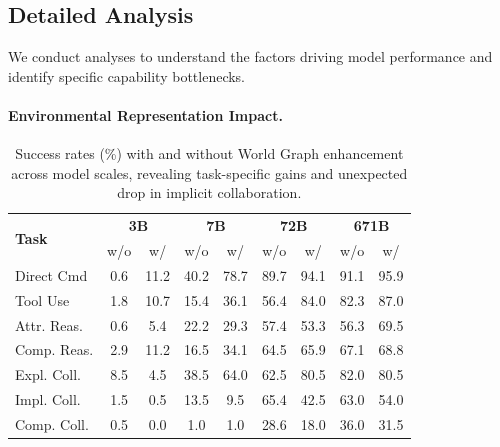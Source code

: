 \subsection{Detailed Analysis}
We conduct analyses to understand the factors driving model performance and identify specific capability bottlenecks.

\paragraph{Environmental Representation Impact.}
\begin{table}
\centering
\small
\setlength{\tabcolsep}{2pt}
\begin{tabular}{@{}lcc|cc|cc|cc@{}}
\toprule
\multirow{2}{*}{\textbf{Task}} & \multicolumn{2}{c|}{\textbf{3B}} & \multicolumn{2}{c|}{\textbf{7B}} & \multicolumn{2}{c|}{\textbf{72B}} & \multicolumn{2}{c}{\textbf{671B}} \\
\cmidrule{2-3} \cmidrule{4-5} \cmidrule{6-7} \cmidrule{8-9}
& w/o & w/ & w/o & w/ & w/o & w/ & w/o & w/ \\
\midrule
Direct Cmd & 0.6 & 11.2 & 40.2 & 78.7 & 89.7 & 94.1 & 91.1 & 95.9 \\
Tool Use & 1.8 & 10.7 & 15.4 & 36.1 & 56.4 & 84.0 & 82.3 & 87.0 \\
Attr. Reas. & 0.6 & 5.4 & 22.2 & 29.3 & 57.4 & 53.3 & 56.3 & 69.5 \\
Comp. Reas. & 2.9 & 11.2 & 16.5 & 34.1 & 64.5 & 65.9 & 67.1 & 68.8 \\
\midrule
Expl. Coll. & 8.5 & 4.5 & 38.5 & 64.0 & 62.5 & 80.5 & 82.0 & 80.5 \\
Impl. Coll. & 1.5 & 0.5 & 13.5 & 9.5 & 65.4 & 42.5 & 63.0 & 54.0 \\
Comp. Coll. & 0.5 & 0.0 & 1.0 & 1.0 & 28.6 & 18.0 & 36.0 & 31.5 \\
\bottomrule
\end{tabular}
\caption{Success rates (\%) with and without World Graph enhancement across model scales, revealing task-specific gains and unexpected drop in implicit collaboration.}
\label{tab:wg_results}
\end{table}



